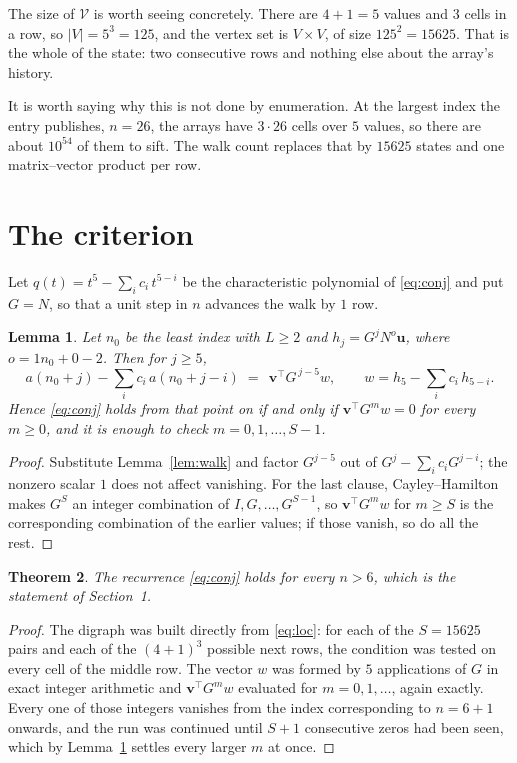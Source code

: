 \documentclass[11pt,a4paper]{article}
\theoremstyle{plain}
\newtheorem{theorem}{Theorem}
\newtheorem{lemma}[theorem]{Lemma}
\theoremstyle{definition}
\begin{document}
The size of $\mathcal V$ is worth seeing concretely. There are $4+1=5$ values
and $3$ cells in a row, so $|V|=5^{3}=125$, and the vertex set is
$V\times V$, of size $125^2=15625$. That is the whole of the state: two consecutive
rows and nothing else about the array's history.

It is worth saying why this is not done by enumeration. At the largest index the entry
publishes, $n=26$, the arrays have $3\cdot26$ cells over
$5$ values, so there are about $10^{54}$ of them to sift. The
walk count replaces that by $15625$ states and one matrix--vector product per row.
\section{The criterion}

Let $q(t)=t^{5}-\sum_i c_i\,t^{5-i}$ be the characteristic polynomial of
\eqref{eq:conj} and put $G=N$, so that a unit step in $n$ advances the walk by
$1$ row.

\begin{lemma}\label{lem:crit}
Let $n_0$ be the least index with $L\ge2$ and $h_j=G^{j}N^{o}\mathbf{u}$, where
$o=1n_0+0-2$. Then for $j\ge5$,
\[
a(n_0+j)-\sum_i c_i\,a(n_0+j-i)\;=\;\,\mathbf{v}^{\!\top}G^{\,j-5}w,
\qquad w=h_{5}-\sum_i c_i\,h_{5-i} .
\]
Hence \eqref{eq:conj} holds from that point on if and only if
$\mathbf{v}^{\!\top}G^{m}w=0$ for every $m\ge0$, and it is enough to check
$m=0,1,\dots,S-1$.
\end{lemma}

\begin{proof}
Substitute Lemma~\ref{lem:walk} and factor $G^{j-5}$ out of
$G^{j}-\sum_ic_iG^{j-i}$; the nonzero scalar $1$ does not affect
vanishing. For the last clause, Cayley--Hamilton makes $G^{S}$ an integer combination of
$I,G,\dots,G^{S-1}$, so $\mathbf{v}^{\!\top}G^{m}w$ for $m\ge S$ is the corresponding
combination of the earlier values; if those vanish, so do all the rest.
\end{proof}

\begin{theorem}
The recurrence \eqref{eq:conj} holds for every $n>6$, which is the statement of
Section~1.
\end{theorem}

\begin{proof}
The digraph was built directly from \eqref{eq:loc}: for each of the $S=15625$ pairs and each
of the $(4+1)^{3}$ possible next rows, the condition was tested on every cell of
the middle row. The vector $w$ was formed by $5$ applications of $G$ in exact integer
arithmetic and $\mathbf{v}^{\!\top}G^{m}w$ evaluated for $m=0,1,\dots$, again exactly.
Every one of those integers vanishes from the index corresponding to $n=6+1$ onwards,
and the run was continued until $S+1$ consecutive zeros had been seen, which by
Lemma~\ref{lem:crit} settles every larger $m$ at once.
\end{proof}
\end{document}
